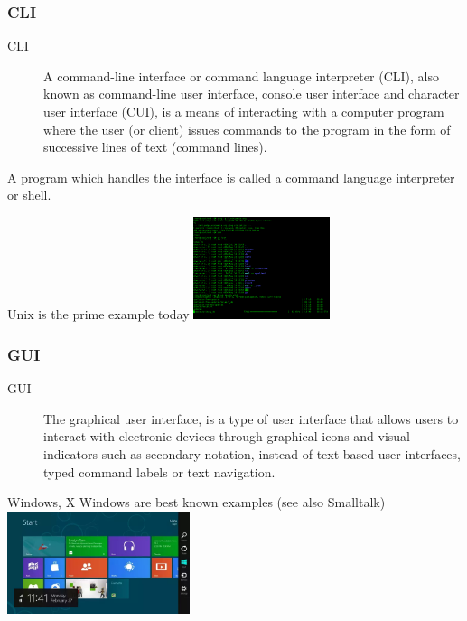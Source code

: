 \documentclass{beamer}
\begin{document}
    \begin{frame}
    	\frametitle{CLI}
    	\begin{description}
    		\item[CLI] A command-line interface or command language interpreter (CLI), also known as command-line user interface, console user interface and character user interface (CUI), is a means of interacting with a computer program where the user (or client) issues commands to the program in the form of successive lines of text (command lines). 
    	\end{description}
    	A program which handles the interface is called a command language interpreter or shell. 
    	
    	Unix is the prime example today
    	\includegraphics[height=3cm]{Bash.png}
    	
    \end{frame}
  
    \begin{frame}
    	\frametitle{GUI}
    	\begin{description}
    		\item[GUI] The graphical user interface, is a type of user interface that allows users to interact with electronic devices through graphical icons and visual indicators such as secondary notation, instead of text-based user interfaces, typed command labels or text navigation.
    	\end{description}
    	Windows, X Windows are best known examples (see also Smalltalk)
    	\includegraphics[height=3cm]{w10.png}
    	
    \end{frame}
\end{document}
